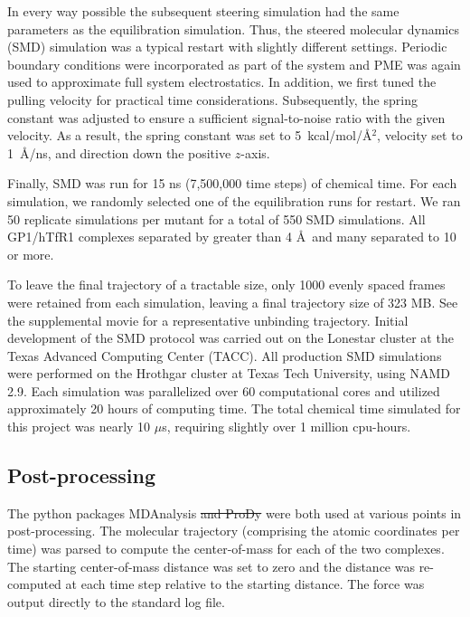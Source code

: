 \documentclass[12pt]{article} %
\providecommand{\DIFadd}[1]{{\protect\color{blue}\uwave{#1}}} %
\providecommand{\DIFdel}[1]{{\protect\color{red}\sout{#1}}}                      %
\providecommand{\DIFaddbegin}{} %
\providecommand{\DIFaddend}{} %
\providecommand{\DIFdelbegin}{} %
\providecommand{\DIFdelend}{} %
\begin{document}
In every way possible the subsequent steering simulation had the same parameters as the equilibration simulation. Thus, the steered molecular dynamics (SMD) \DIFdelbegin %
\DIFdelend \DIFaddbegin \citep{Is2001A,Is2001B} \DIFaddend simulation was a typical restart with slightly different settings. Periodic boundary conditions were incorporated as part of the system and PME was again used to approximate full system electrostatics. In addition, we first tuned the pulling velocity for practical time considerations. Subsequently, the spring constant was adjusted to ensure a sufficient signal-to-noise ratio with the given velocity. As a result, the spring constant was set to 5~kcal/mol/\AA$^2$, velocity set to 1~\AA/ns, and direction down the positive $z$-axis.

Finally, SMD was run for 15 ns (7,500,000 time steps) of chemical time. For each simulation, we randomly selected one of the equilibration runs for restart. We ran 50 replicate simulations per mutant for a total of 550 SMD simulations. All GP1/hTfR1 complexes separated by greater than 4 \AA\ and many separated to 10 or more.

To leave the final trajectory of a tractable size, only 1000 evenly spaced frames were retained from each simulation, leaving a final trajectory size of 323 MB. See the supplemental movie for a representative unbinding trajectory. Initial development of the SMD protocol was carried out on the Lonestar cluster at the Texas Advanced Computing Center (TACC). All production SMD simulations were performed on the Hrothgar cluster at Texas Tech University, using NAMD 2.9. Each simulation was parallelized over 60 computational cores and utilized approximately 20 hours of computing time. The total chemical time simulated for this project was nearly 10 $\mu$s, requiring slightly over 1 million cpu-hours.

\subsection{Post-processing}

The python packages MDAnalysis \DIFdelbegin %
\DIFdel{and ProDy }%
\DIFdelend \DIFaddbegin \citep{Agrawal2011} \DIFadd{and ProDy }\citep{Bakan2011} \DIFaddend were both used at various points in post-processing. The molecular trajectory (comprising the atomic coordinates per time) was parsed to compute the center-of-mass for each of the two complexes. The starting center-of-mass distance was set to zero and the distance was re-computed at each time step relative to the starting distance. The force was output directly to the standard log file.
\end{document}
